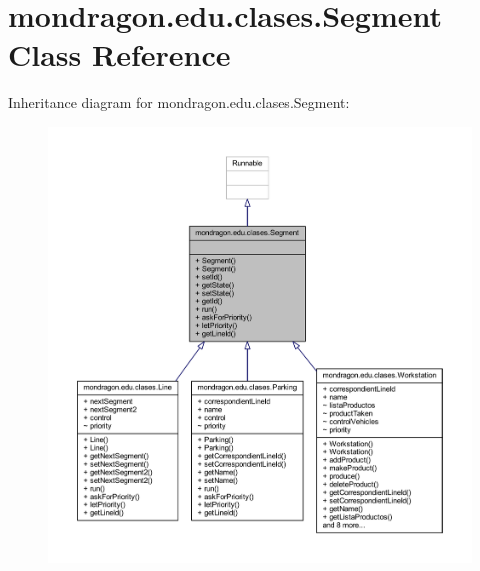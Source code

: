 \hypertarget{classmondragon_1_1edu_1_1clases_1_1_segment}{}\section{mondragon.\+edu.\+clases.\+Segment Class Reference}
\label{classmondragon_1_1edu_1_1clases_1_1_segment}


Inheritance diagram for mondragon.\+edu.\+clases.\+Segment\+:\nopagebreak
\begin{figure}[H]
\begin{center}
\leavevmode
\includegraphics[width=350pt]{classmondragon_1_1edu_1_1clases_1_1_segment__inherit__graph}
\end{center}
\end{figure}


